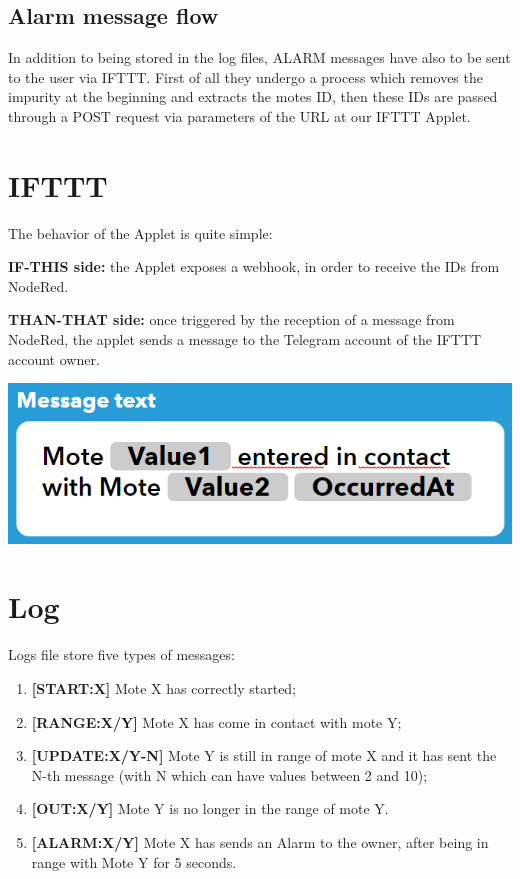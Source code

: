 \documentclass[12pt]{article}
\begin{document}
\subsection{Alarm message flow}
In addition to being stored in the log files, ALARM messages have also to be sent to the user via IFTTT. \newline
First of all they undergo a process which removes the impurity at the beginning and extracts the motes ID, then these IDs are passed through a POST request via parameters of the URL at our IFTTT Applet.

\section{IFTTT}
The behavior of the Applet is quite simple:
\begin{itemize}
  \item{\textbf{IF-THIS side:} the Applet exposes a webhook, in order to receive the IDs from NodeRed.
  \item {\textbf{THAN-THAT side:} once triggered by the reception of a message from NodeRed, the applet sends a message to the Telegram account of the IFTTT account owner.}}
\end{itemize}

\includegraphics[scale=0.8]{Message_Text.PNG}

\section{Log}

Logs file store five types of messages:
\begin{enumerate}
\item \textbf{[START:X]} Mote X has correctly started;
\item \textbf{[RANGE:X/Y]} Mote X has come in contact with mote Y;
\item \textbf{[UPDATE:X/Y-N]} Mote Y is still in range of mote X and it has sent the N-th message (with N which can have values between 2 and 10);
\item \textbf{[OUT:X/Y]} Mote Y is no longer in the range of mote Y.
\item \textbf{[ALARM:X/Y]} Mote X has sends an Alarm to the owner, after being in range with Mote Y for 5 seconds.
\end{enumerate}
\end{document}
